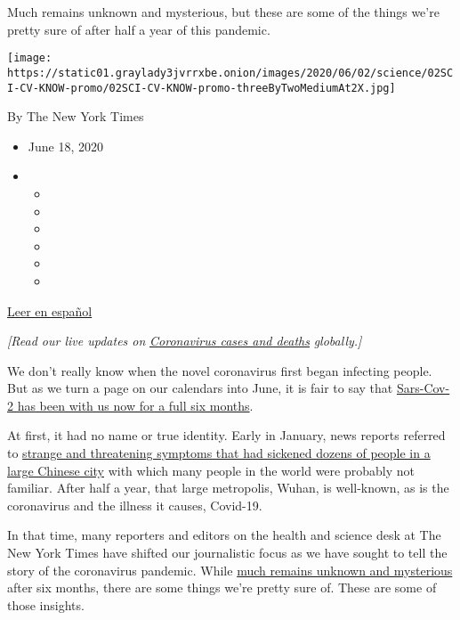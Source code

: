 Much remains unknown and mysterious, but these are some of the things
we're pretty sure of after half a year of this pandemic.

\texttt{[image: https://static01.graylady3jvrrxbe.onion/images/2020/06/02/science/02SCI-CV-KNOW-promo/02SCI-CV-KNOW-promo-threeByTwoMediumAt2X.jpg]}

By The New York Times

\begin{itemize}
\item
  June 18, 2020
\item
  \begin{itemize}
  \item
  \item
  \item
  \item
  \item
  \item
  \end{itemize}
\end{itemize}

\href{https://www.nytimes3xbfgragh.onion/es/2020/06/04/espanol/datos-coronavirus.html}{Leer
en español}

\emph{{[}Read our live updates on}
\href{https://www.nytimes3xbfgragh.onion/2020/06/18/world/coronavirus-cases-usa-world.html}{\emph{Coronavirus
cases and deaths}} \emph{globally.{]}}

We don't really know when the novel coronavirus first began infecting
people. But as we turn a page on our calendars into June, it is fair to
say that
\href{https://www.nytimes3xbfgragh.onion/2020/06/02/health/coronavirus-profile-covid.html}{Sars-Cov-2
has been with us now for a full six months}.

At first, it had no name or true identity. Early in January, news
reports referred to
\href{https://www.nytimes3xbfgragh.onion/2020/01/06/world/asia/china-SARS-pneumonialike.html}{strange
and threatening symptoms that had sickened dozens of people in a large
Chinese city} with which many people in the world were probably not
familiar. After half a year, that large metropolis, Wuhan, is
well-known, as is the coronavirus and the illness it causes, Covid-19.

In that time, many reporters and editors on the health and science desk
at The New York Times have shifted our journalistic focus as we have
sought to tell the story of the coronavirus pandemic. While
\href{https://www.nytimes3xbfgragh.onion/2020/06/01/health/coronavirus-mysteries.html}{much
remains unknown and mysterious} after six months, there are some things
we're pretty sure of. These are some of those insights.

